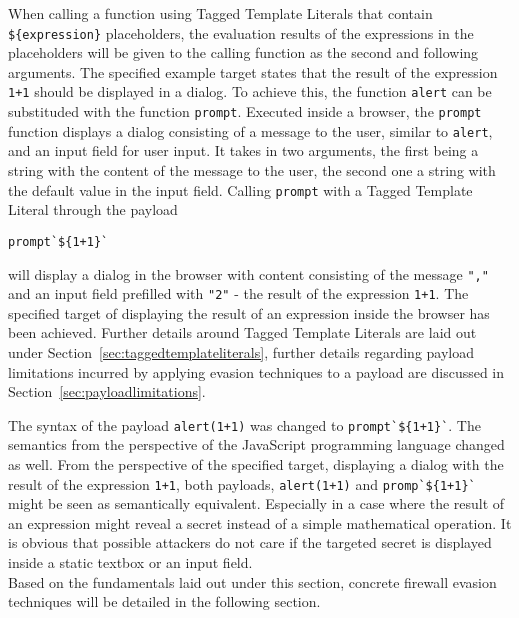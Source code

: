 When calling a function using Tagged Template Literals that contain \verb|${expression}| placeholders, the evaluation results of the expressions in the placeholders will be given to the calling function as the second and following arguments.
The specified example target states that the result of the expression \verb|1+1| should be displayed in a dialog.
To achieve this, the function \verb|alert| can be substituded with the function \verb|prompt|. Executed inside a browser, the \verb|prompt| function displays a dialog consisting of a message to the user, similar to \verb|alert|, and an input field for user input. It takes in two arguments, the first being a string with the content of the message to the user, the second one a string with the default value in the input field. 
Calling \verb|prompt| with a Tagged Template Literal through the payload
\begin{lstlisting}[style=basicStyle]
prompt`${1+1}`
\end{lstlisting}
will display a dialog in the browser with content consisting of the message \verb|","| and an input field prefilled with \verb|"2"| - the result of the expression \verb|1+1|. The specified target of displaying the result of an expression inside the browser has been achieved.
Further details around Tagged Template Literals are laid out under Section~\ref{sec:taggedtemplateliterals}, further details regarding payload limitations incurred by applying evasion techniques to a payload are discussed in Section~\ref{sec:payloadlimitations}. 
\cite{js/taggedtemplates,js/alert,js/prompt}

The syntax of the payload \verb|alert(1+1)| was changed to \verb|prompt`${1+1}`|. The semantics from the perspective of the JavaScript programming language changed as well. From the perspective of the specified target, displaying a dialog with the result of the expression \verb|1+1|, both payloads, \verb|alert(1+1)| and \verb|promp`${1+1}`| might be seen as semantically equivalent. Especially in a case where the result of an expression might reveal a secret instead of a simple mathematical operation. It is obvious that possible attackers do not care if the targeted secret is displayed inside a static textbox or an input field. \\

Based on the fundamentals laid out under this section, concrete firewall evasion techniques will be detailed in the following section.

